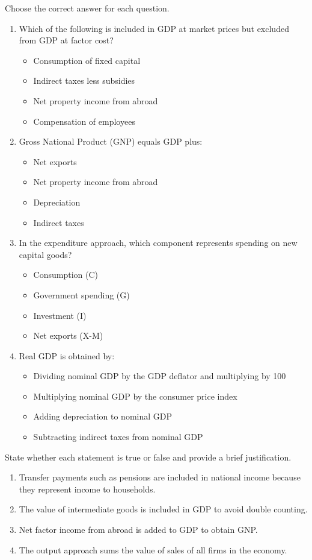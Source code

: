 \documentclass[11pt]{article}
\begin{document}
\begin{exercice}
Choose the correct answer for each question.
\begin{enumerate}
\item Which of the following is included in GDP at market prices but excluded from GDP at factor cost?
\begin{itemize}
\item[a)] Consumption of fixed capital
\item[b)] Indirect taxes less subsidies
\item[c)] Net property income from abroad
\item[d)] Compensation of employees
\end{itemize}
\item Gross National Product (GNP) equals GDP plus:
\begin{itemize}
\item[a)] Net exports
\item[b)] Net property income from abroad
\item[c)] Depreciation
\item[d)] Indirect taxes
\end{itemize}
\item In the expenditure approach, which component represents spending on new capital goods?
\begin{itemize}
\item[a)] Consumption (C)
\item[b)] Government spending (G)
\item[c)] Investment (I)
\item[d)] Net exports (X-M)
\end{itemize}
\item Real GDP is obtained by:
\begin{itemize}
\item[a)] Dividing nominal GDP by the GDP deflator and multiplying by 100
\item[b)] Multiplying nominal GDP by the consumer price index
\item[c)] Adding depreciation to nominal GDP
\item[d)] Subtracting indirect taxes from nominal GDP
\end{itemize}
\end{enumerate}
\end{exercice}

\begin{exercice}
State whether each statement is true or false and provide a brief justification.
\begin{enumerate}
\item Transfer payments such as pensions are included in national income because they represent income to households.
\item The value of intermediate goods is included in GDP to avoid double counting.
\item Net factor income from abroad is added to GDP to obtain GNP.
\item The output approach sums the value of sales of all firms in the economy.
\end{enumerate}
\end{exercice}
\end{document}
